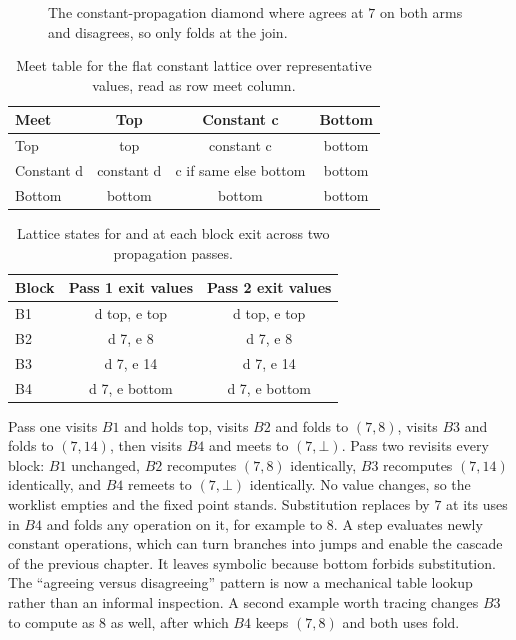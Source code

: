 \begin{figure}
\caption{The constant-propagation diamond where  agrees at $7$ on both arms and  disagrees, so only  folds at the join.}
\label{fig:ch14-diamond}
\end{figure}

\begin{table}
\caption{Meet table for the flat constant lattice over representative values, read as row meet column.}
\label{tab:ch14-meet}
\begin{tabular}{lccc}
\toprule
Meet & Top & Constant c & Bottom \\
\midrule
Top & top & constant c & bottom \\
Constant d & constant d & c if same else bottom & bottom \\
Bottom & bottom & bottom & bottom \\
\bottomrule
\end{tabular}
\end{table}

\begin{table}
\caption{Lattice states for  and  at each block exit across two propagation passes.}
\label{tab:ch14-trace}
\begin{tabular}{lcc}
\toprule
Block & Pass 1 exit values & Pass 2 exit values \\
\midrule
B1 & d top, e top & d top, e top \\
B2 & d 7, e 8 & d 7, e 8 \\
B3 & d 7, e 14 & d 7, e 14 \\
B4 & d 7, e bottom & d 7, e bottom \\
\bottomrule
\end{tabular}
\end{table}

Pass one visits $B1$ and holds top, visits $B2$ and folds to $(7, 8)$, visits $B3$ and folds to $(7, 14)$, then visits $B4$ and meets to $(7, \bot)$.
Pass two revisits every block: $B1$ unchanged, $B2$ recomputes $(7, 8)$ identically, $B3$ recomputes $(7, 14)$ identically, and $B4$ remeets to $(7, \bot)$ identically.
No value changes, so the worklist empties and the fixed point stands.
Substitution replaces  by $7$ at its uses in $B4$ and folds any operation on it, for example  to $8$.
A  step evaluates newly constant operations, which can turn branches into jumps and enable the cascade of the previous chapter.
It leaves  symbolic because bottom forbids substitution.
The \enquote{agreeing versus disagreeing} pattern is now a mechanical table lookup rather than an informal inspection.
A second example worth tracing changes $B3$ to compute  as $8$ as well, after which $B4$ keeps $(7, 8)$ and both uses fold.

